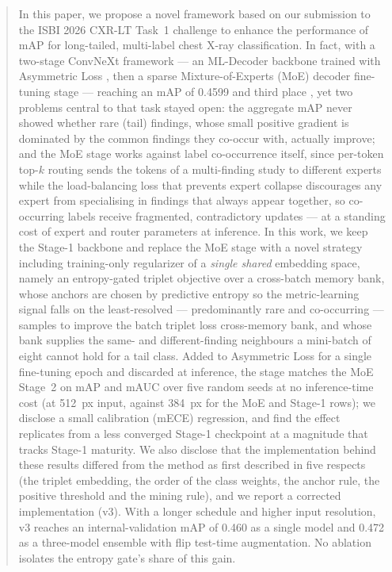 \documentclass[conference]{IEEEtran}
\begin{document}
\begin{abstract}
In this paper, we propose a novel framework based on our submission to the ISBI 2026 CXR-LT Task~1 challenge \cite{b12} to enhance the performance of mAP for long-tailed, multi-label chest X-ray classification. In fact, with a two-stage ConvNeXt framework --- an ML-Decoder backbone trained with Asymmetric Loss
, then a sparse Mixture-of-Experts (MoE) decoder fine-tuning stage --- reaching an mAP of 0.4599 and third place 
, yet two problems central to that task stayed open: the aggregate mAP never showed whether rare (tail) findings, whose small positive gradient is dominated by the common findings they co-occur with, actually improve; and the MoE stage works against label co-occurrence itself, since per-token top-$k$ routing sends the tokens of a multi-finding study to different experts while the load-balancing loss that prevents expert collapse discourages any expert from specialising in findings that always appear together, so co-occurring labels receive fragmented, contradictory updates --- at a standing cost of expert and router parameters at inference. In this work, we keep the Stage-1 backbone and replace the MoE stage with a novel strategy including training-only regularizer of a \emph{single shared} embedding space, namely an entropy-gated triplet objective over a cross-batch memory bank, whose anchors are chosen by predictive entropy so the metric-learning signal falls on the least-resolved --- predominantly rare and co-occurring --- samples to improve the batch triplet loss cross-memory bank, and whose bank supplies the same- and different-finding neighbours a mini-batch of eight cannot hold for a tail class. Added to Asymmetric Loss for a single fine-tuning epoch and discarded at inference, the stage matches the MoE Stage~2 on mAP and mAUC over five random seeds at no inference-time cost (at 512~px input, against 384~px for the MoE and Stage-1 rows); we disclose a small calibration (mECE) regression, and find the effect replicates from a less converged Stage-1 checkpoint at a magnitude that tracks Stage-1 maturity. We also disclose that the implementation behind these results differed from the method as first described in five respects (the triplet embedding, the order of the class weights, the anchor rule, the positive threshold and the mining rule), and we report a corrected implementation (v3). With a longer schedule and higher input resolution, v3 reaches an internal-validation mAP of 0.460 as a single model and 0.472 as a three-model ensemble with flip test-time augmentation. No ablation isolates the entropy gate's share of this gain.
\end{abstract}
\end{document}
